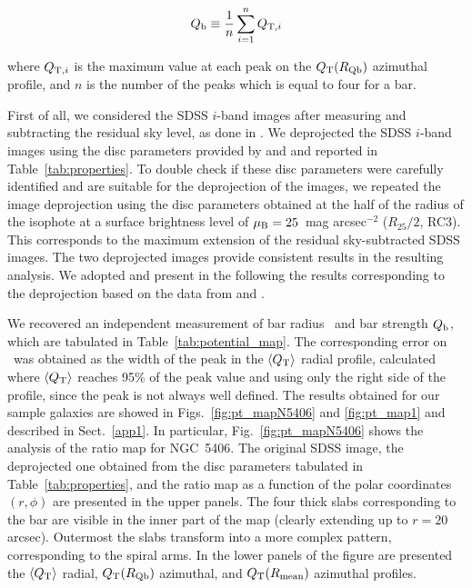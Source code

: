 \documentclass{aa}
\begin{document}
\begin{equation}
    Q_{\rm b} \equiv \frac{1}{n}\sum^n_{i=1} Q_{{\rm T},i}
\end{equation}

\noindent where $Q_{{\rm T},i}$ is the maximum value at each peak on the $Q_{\rm T}(R_{\rm Qb})$ azimuthal profile, and $n$ is the number of the peaks which is equal to four for a bar.

First of all, we considered the SDSS $i$-band images after measuring and subtracting the residual sky level, as done in \citet{morelli2016}. We deprojected the SDSS $i$-band images using the disc parameters provided by \cite{Aguerri2015} and \cite{Cuomo2019b} and reported in Table~\ref{tab:properties}. To double check if these disc parameters were carefully identified and are suitable for the deprojection of the images, we repeated the image deprojection using the disc parameters obtained at the half of the radius of the isophote at a surface brightness level of $\mu_{\rm B}=25$~mag arcsec$^{-2}$ ($R_{25}/2$, RC3). This corresponds to the maximum extension of the residual sky-subtracted SDSS images. The two deprojected images provide consistent results in the resulting analysis. We adopted and present in the following the results corresponding to the deprojection based on the data from \citet{Aguerri2015} and \citet{Cuomo2019b}.

We recovered an independent measurement of bar radius \rqb\ and bar strength $Q_{\rm b}$, which are tabulated in Table~\ref{tab:potential_map}. The corresponding error on \rqb\ was obtained as the width of the peak in the $\langle Q_{\rm T}\rangle$ radial profile, calculated where $\langle Q_{\rm T}\rangle$ reaches 95\% of the peak value and using only the right side of the profile, since the peak is not always well defined. The results obtained for our sample galaxies are showed in Figs.~\ref{fig:pt_mapN5406} and \ref{fig:pt_map1} and described in Sect.~\ref{app1}. In particular, Fig.~\ref{fig:pt_mapN5406} shows the analysis of the ratio map for NGC~5406. The original SDSS image, the deprojected one obtained from the disc parameters tabulated in Table~\ref{tab:properties}, and the ratio map as a function of the polar coordinates $(r,\phi)$  are presented in the upper panels. The four thick slabs corresponding to the bar are visible in the inner part of the map (clearly extending up to $r=20$ arcsec). Outermost the slabs transform into a more complex pattern, corresponding to the spiral arms. In the lower panels of the figure are presented the $\langle Q_{\rm T}\rangle$ radial, $Q_{\rm T}(R_{\rm Qb})$ azimuthal, and $Q_{\rm T}(R_{\rm mean})$ azimuthal profiles. 
\end{document}
